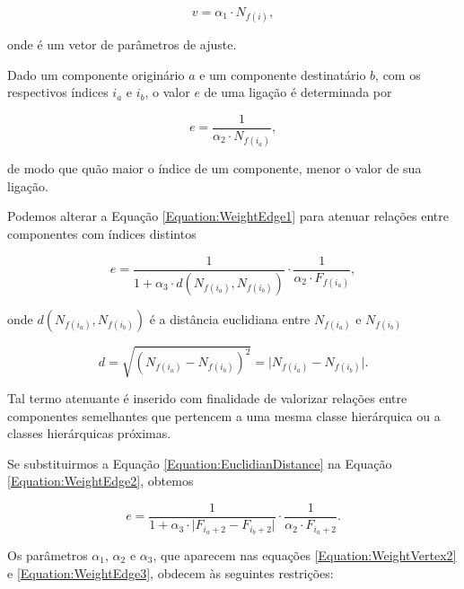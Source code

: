 \begin{equation}
	\label{Equation:WeightVertex1}
	v = \alpha_1 \cdot N_{f(i)},
\end{equation}

\noindent
onde \boldsymbol{$\alpha$} é um vetor de parâmetros de ajuste.

Dado um componente originário $a$ e um componente destinatário $b$, com os
respectivos índices $i_a$ e $i_b$, o valor $e$ de uma ligação é determinada por  

\begin{equation}
	\label{Equation:WeightEdge1}
	e = \frac{1}{\alpha_2 \cdot N_{f(i_a)}},
\end{equation}

\noindent
de modo que quão maior o índice de um componente, menor o valor de sua ligação.

Podemos alterar a Equação \ref{Equation:WeightEdge1} para atenuar relações entre
componentes com índices distintos

\begin{equation}
	\label{Equation:WeightEdge2}
	e = \frac{1}{1 + \alpha_3 \cdot d(N_{f(i_a)}, N_{f(i_b)})} \cdot \frac{1}{\alpha_2 \cdot F_{f(i_a)}},
\end{equation}

\noindent
onde $d(N_{f(i_a)}, N_{f(i_b)})$ é a distância euclidiana entre $N_{f(i_a)}$ e 
$N_{f(i_b)}$

\begin{equation}
	\label{Equation:EuclidianDistance}
	d = \sqrt{(N_{f(i_a)} - N_{f(i_b)})^2} = \lvert N_{f(i_a)} - N_{f(i_b)} \rvert.
\end{equation}

\noindent
Tal termo atenuante é inserido com finalidade de valorizar relações entre
componentes semelhantes que pertencem a uma mesma classe hierárquica ou a
classes hierárquicas próximas.

Se substituirmos a Equação \ref{Equation:EuclidianDistance} na Equação
\ref{Equation:WeightEdge2}, obtemos

\begin{equation}
	\label{Equation:WeightEdge3}
	e = \frac{1}{1 + \alpha_3 \cdot \lvert F_{i_a+2} - F_{i_b+2} \rvert} \cdot \frac{1}{\alpha_2 \cdot F_{i_a+2}}.
\end{equation}

Os parâmetros $\alpha_1$, $\alpha_2$ e $\alpha_3$, que aparecem nas equações
\ref{Equation:WeightVertex2} e \ref{Equation:WeightEdge3}, obdecem às seguintes
restrições:

